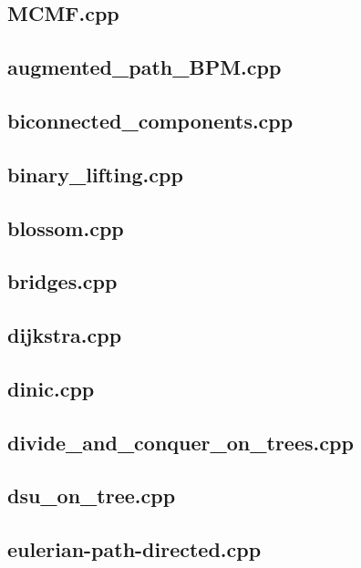 \subsection{MCMF.cpp}

\subsection{augmented\_path\_BPM.cpp}

\subsection{biconnected\_components.cpp}

\subsection{binary\_lifting.cpp}

\subsection{blossom.cpp}

\subsection{bridges.cpp}

\subsection{dijkstra.cpp}

\subsection{dinic.cpp}

\subsection{divide\_and\_conquer\_on\_trees.cpp}

\subsection{dsu\_on\_tree.cpp}

\subsection{eulerian-path-directed.cpp}


